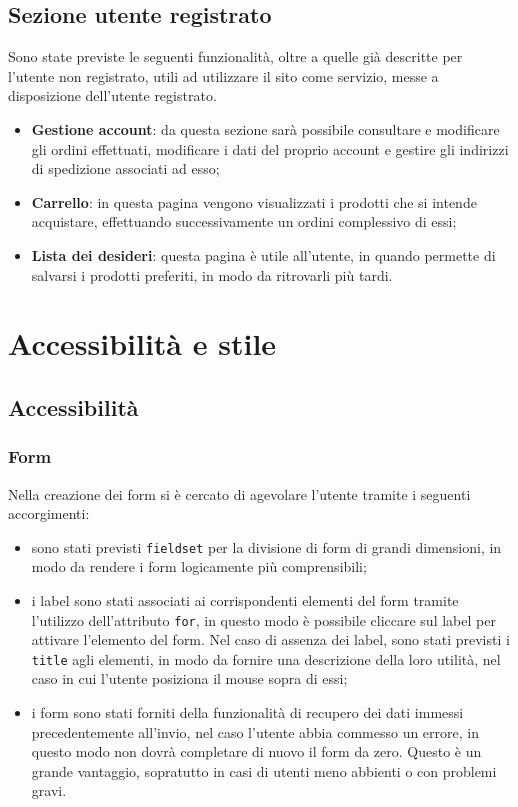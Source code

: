 	\subsection{Sezione utente registrato}
	Sono state previste le seguenti funzionalità, oltre a quelle già descritte per l'utente non registrato, utili ad utilizzare il sito come servizio, messe a disposizione dell'utente registrato.
	\begin{itemize}
		\item \textbf{Gestione account}: da questa sezione sarà possibile consultare e modificare gli ordini effettuati, modificare i dati del proprio account e gestire gli indirizzi di spedizione associati ad esso;
		\item \textbf{Carrello}: in questa pagina vengono visualizzati i prodotti che si intende acquistare, effettuando successivamente un ordini complessivo di essi;
		\item \textbf{Lista dei desideri}: questa pagina è utile all'utente, in quando permette di salvarsi i prodotti preferiti, in modo da ritrovarli più tardi.
	\end{itemize}

\section{Accessibilità e stile} %
	\subsection{Accessibilità}
	
		\subsubsection{Form}
		Nella creazione dei form si è cercato di agevolare l'utente tramite i seguenti accorgimenti:
		\begin{itemize}
			\item sono stati previsti \texttt{fieldset} per la divisione di form di grandi dimensioni, in modo da rendere i form logicamente più comprensibili;
			\item i label sono stati associati ai corrispondenti elementi del form tramite l'utilizzo dell'attributo \texttt{for}, in questo modo è possibile cliccare sul label per attivare l'elemento del form. Nel caso di assenza dei label, sono stati previsti i \texttt{title} agli elementi, in modo da fornire una descrizione della loro utilità, nel caso in cui l'utente posiziona il mouse sopra di essi;
			\item i form sono stati forniti della funzionalità di recupero dei dati immessi precedentemente all'invio, nel caso l'utente abbia commesso un errore, in questo modo non dovrà completare di nuovo il form da zero. Questo è un grande vantaggio, sopratutto in casi di utenti meno abbienti o con problemi gravi.
		\end{itemize}
	
